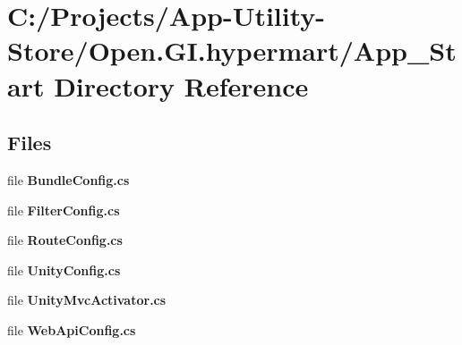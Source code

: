 \section{C\+:/\+Projects/\+App-\/\+Utility-\/\+Store/\+Open.G\+I.\+hypermart/\+App\+\_\+\+Start Directory Reference}
\label{dir_7d4b9f59274de554cdf352c13b13162d}
\subsection*{Files}
\begin{DoxyCompactItemize}
\item 
file \textbf{ Bundle\+Config.\+cs}
\item 
file \textbf{ Filter\+Config.\+cs}
\item 
file \textbf{ Route\+Config.\+cs}
\item 
file \textbf{ Unity\+Config.\+cs}
\item 
file \textbf{ Unity\+Mvc\+Activator.\+cs}
\item 
file \textbf{ Web\+Api\+Config.\+cs}
\end{DoxyCompactItemize}
